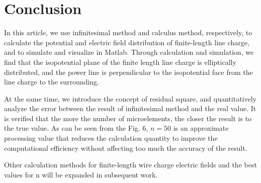 \documentclass[journal,twocolumn,letterpaper]{IEEEJERM}
\begin{document}
\section{Conclusion}
In this article, we use infinitesimal method and calculus method, respectively, to calculate the potential and electric field distribution of finite-length line charge, and to simulate and visualize in Matlab. Through calculation and simulation, we find that the isopotential plane of the finite length line charge is elliptically distributed, and the power line is perpendicular to the isopotential face from the line charge to the surrounding. 

At the same time, we introduce the concept of residual square, and quantitatively analyze the error between the result of infinitesimal method and the real value. It is verified that the more the number of microelements, the closer the result is to the true value. As can be seen from the Fig. 6, $n=50$ is an approximate processing value that reduces the calculation quantity to improve the computational efficiency without affecting too much the accuracy of the result.

Other calculation methods for finite-length wire charge electric fields and the best values for n will be expanded in subsequent work. 









% 



\end{document}
